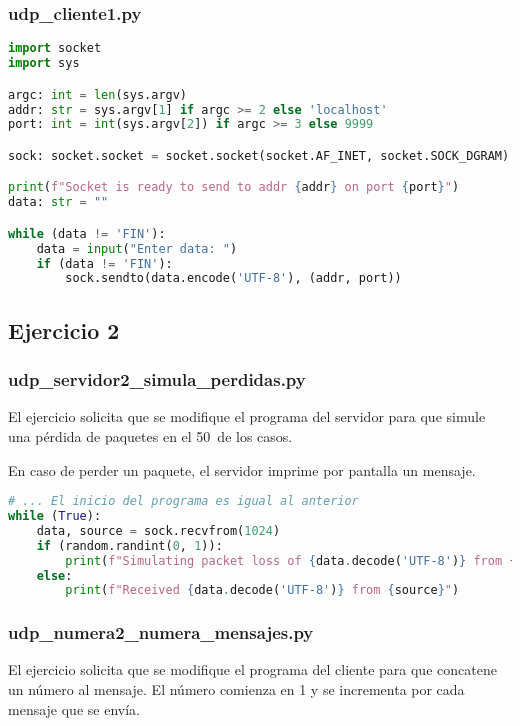 \subsubsection{udp\_cliente1.py}

\begin{lstlisting}[language=Python]
import socket
import sys

argc: int = len(sys.argv)
addr: str = sys.argv[1] if argc >= 2 else 'localhost'
port: int = int(sys.argv[2]) if argc >= 3 else 9999

sock: socket.socket = socket.socket(socket.AF_INET, socket.SOCK_DGRAM)

print(f"Socket is ready to send to addr {addr} on port {port}")
data: str = ""

while (data != 'FIN'):
    data = input("Enter data: ")
    if (data != 'FIN'):
        sock.sendto(data.encode('UTF-8'), (addr, port))
\end{lstlisting}

\subsection{Ejercicio 2}

\subsubsection{udp\_servidor2\_simula\_perdidas.py}

El ejercicio solicita que se modifique el programa del servidor para que simule una pérdida de paquetes
en el 50\percentsign\ de los casos.

En caso de perder un paquete, el servidor imprime por pantalla un mensaje.

\begin{lstlisting}[language=Python]
# ... El inicio del programa es igual al anterior
while (True):
    data, source = sock.recvfrom(1024)
    if (random.randint(0, 1)):
        print(f"Simulating packet loss of {data.decode('UTF-8')} from {source}")
    else:
        print(f"Received {data.decode('UTF-8')} from {source}")
\end{lstlisting}

\subsubsection{udp\_numera2\_numera\_mensajes.py}

El ejercicio solicita que se modifique el programa del cliente para que concatene un número al mensaje.
El número comienza en 1 y se incrementa por cada mensaje que se envía.

